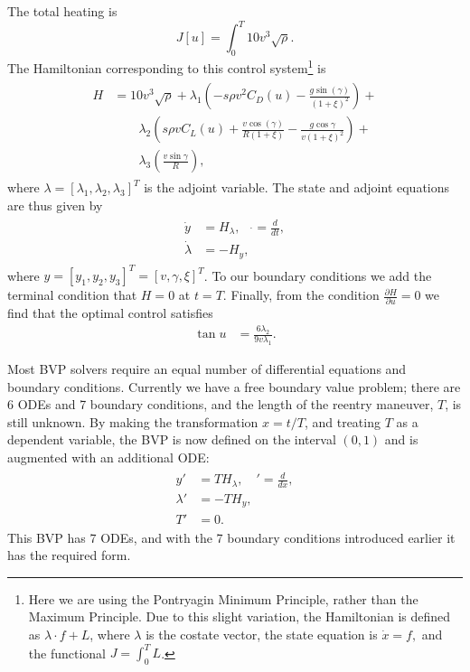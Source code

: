 The total heating is
\[
J[u] = \int_0^T 10 v^3 \sqrt{\rho}.
\]
The Hamiltonian corresponding to this control system\footnote{Here we are using the Pontryagin Minimum Principle, rather than the Maximum Principle. Due to this slight variation, the Hamiltonian is defined as  $\lambda  \cdot f + L$, where $\lambda$ is the costate vector, the state equation is $\dot{x} = f,$ and the functional $J = \int_0^T L$.} is
\begin{align}
	\begin{split}
H &=  10v^3 \sqrt{\rho} + \lambda_1 \left ( -s\rho v^2C_D(u) - \frac{g\sin(\gamma)}{(1+\xi)^2} \right) + \\
&{ }\quad \quad\lambda_2 \left( s \rho v C_L(u) + \frac{v \cos(\gamma)}{R(1+\xi)} - \frac{g \cos \gamma}{v(1+\xi)^2} \right) + \\
&{ }\quad \quad \lambda_3 \left( \frac{v \sin \gamma}{R} \right),
	\end{split}
\end{align}
where $\lambda = [\lambda_1,\lambda_2,\lambda_3]^T$ is the adjoint variable.
The state and adjoint equations are thus given by
\begin{align}
\begin{split}
	\dot{y} &= H_{\lambda},\quad \dot{} = \frac{d}{dt},\\
	\dot{\lambda} &= -H_{y},
\end{split}
\end{align}
where $y = [y_1,y_2,y_3]^T = [v,\gamma, \xi]^T$.
To our boundary conditions we add the terminal condition that $H = 0$ at $t = T$.
Finally, from the condition $\frac{\partial H}{\partial u} = 0$ we find that the optimal control satisfies
\begin{align}
\tan u &= \frac{6\lambda_2}{9v\lambda_1}.
\end{align}

Most BVP solvers require an equal number of differential equations and boundary conditions.
Currently we have a free boundary value problem; there are 6 ODEs and 7 boundary conditions, and the length of the reentry maneuver, $T$, is still unknown.
By making the transformation $x = t/T$, and treating $T$ as a dependent variable, the BVP is now defined on the interval $(0,1)$ and is augmented with an additional ODE:
\begin{align}
\begin{split}
	y' &= TH_{\lambda},\quad ' = \frac{d}{dx},\\
	\lambda' &= -TH_{y},\\
	T' &= 0. \label{eqn:reentry:full_system}
\end{split}
\end{align}
This BVP has 7 ODEs, and with the 7 boundary conditions introduced earlier it has the required form.


